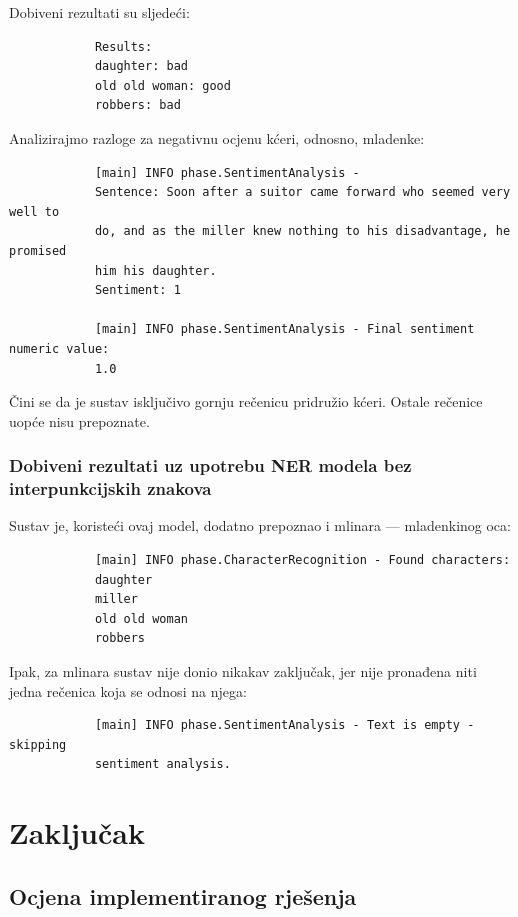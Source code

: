 \documentclass[a4paper,twoside,12pt]{memoir} %
\begin{document}
		Dobiveni rezultati su sljedeći:

		\begin{verbatim}
			Results:
			daughter: bad
			old old woman: good
			robbers: bad
		\end{verbatim}

		Analizirajmo razloge za negativnu ocjenu kćeri, odnosno, mladenke:

		\begin{verbatim}
			[main] INFO phase.SentimentAnalysis -
			Sentence: Soon after a suitor came forward who seemed very well to
			do, and as the miller knew nothing to his disadvantage, he promised
			him his daughter.
			Sentiment: 1

			[main] INFO phase.SentimentAnalysis - Final sentiment numeric value:
			1.0
		\end{verbatim}

		Čini se da je sustav isključivo gornju rečenicu pridružio kćeri. Ostale rečenice uopće nisu prepoznate.

		\subsection{Dobiveni rezultati uz upotrebu NER modela bez interpunkcijskih znakova}

		Sustav je, koristeći ovaj model, dodatno prepoznao i mlinara --- mladenkinog oca:

		\begin{verbatim}
			[main] INFO phase.CharacterRecognition - Found characters:
			daughter
			miller
			old old woman
			robbers
		\end{verbatim}

		Ipak, za mlinara sustav nije donio nikakav zaključak, jer nije pronađena niti jedna rečenica koja se odnosi na njega:

		\begin{verbatim}
			[main] INFO phase.SentimentAnalysis - Text is empty - skipping
			sentiment analysis.
		\end{verbatim}


\chapter{Zaključak}


	\section{Ocjena implementiranog rješenja}
\end{document}
